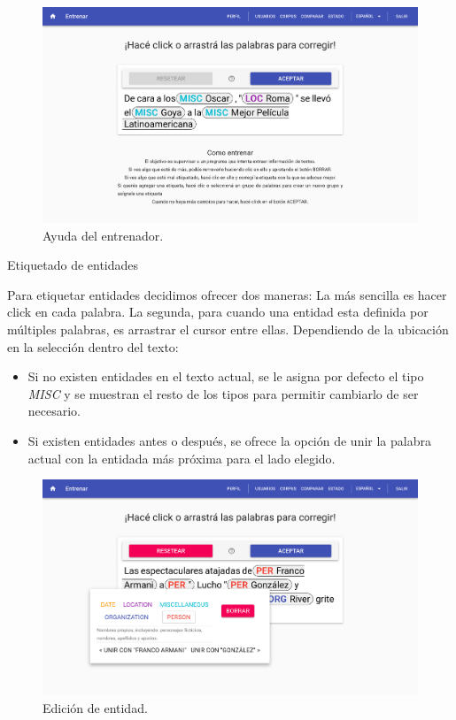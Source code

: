 \documentclass[12pt,a4paper,]{scrartcl}
\providecommand{\tightlist}{%
  \setlength{\itemsep}{0pt}\setlength{\parskip}{0pt}}
\begin{document}
\begin{figure}[H]

{\centering \includegraphics{assets/logic/train-help.pdf} 

}

\caption{Ayuda del entrenador.}\label{fig:logic-train-help}
\end{figure}

Etiquetado de entidades

Para etiquetar entidades decidimos ofrecer dos maneras: La más sencilla es hacer click en cada palabra. La segunda, para cuando una entidad esta definida por múltiples palabras, es arrastrar el cursor entre ellas.
Dependiendo de la ubicación en la selección dentro del texto:

\begin{itemize}
\tightlist
\item
  Si no existen entidades en el texto actual, se le asigna por defecto el tipo \emph{MISC} y se muestran el resto de los tipos para permitir cambiarlo de ser necesario.
\item
  Si existen entidades antes o después, se ofrece la opción de unir la palabra actual con la entidada más próxima para el lado elegido.
\end{itemize}

\begin{figure}[H]

{\centering \includegraphics{assets/logic/train-popup.pdf} 

}

\caption{Edición de entidad.}\label{fig:logic-train-popup}
\end{figure}
\end{document}

